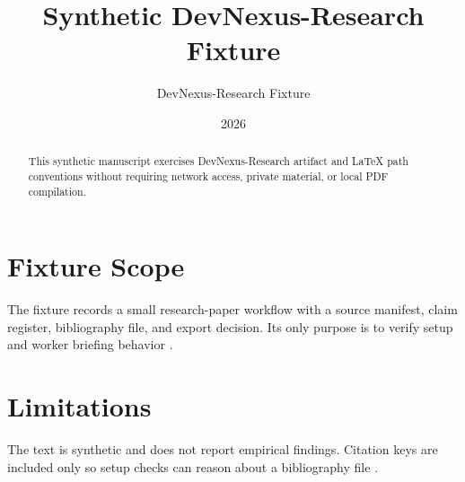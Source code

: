 \documentclass{article}
\title{Synthetic DevNexus-Research Fixture}
\author{DevNexus-Research Fixture}
\date{2026}
\begin{document}
\maketitle

\begin{abstract}
This synthetic manuscript exercises DevNexus-Research artifact and LaTeX path
conventions without requiring network access, private material, or local PDF
compilation.
\end{abstract}

\section{Fixture Scope}

The fixture records a small research-paper workflow with a source manifest,
claim register, bibliography file, and export decision. Its only purpose is to
verify setup and worker briefing behavior \cite{synthetic2026method}.

\section{Limitations}

The text is synthetic and does not report empirical findings. Citation keys are
included only so setup checks can reason about a bibliography file
\cite{synthetic2026related}.



\end{document}
